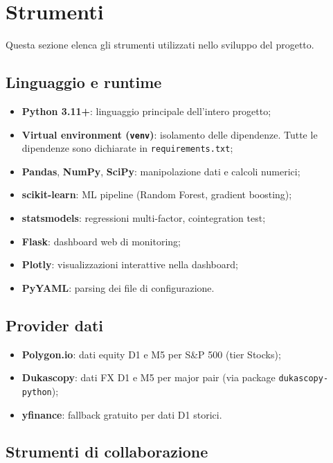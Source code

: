 \section{Strumenti}

Questa sezione elenca gli strumenti utilizzati nello sviluppo del progetto.

\subsection{Linguaggio e runtime}

\begin{itemize}
  \item \textbf{Python 3.11+}: linguaggio principale dell'intero progetto;
  \item \textbf{Virtual environment (\texttt{venv})}: isolamento delle dipendenze. Tutte le dipendenze sono dichiarate in \texttt{requirements.txt};
  \item \textbf{Pandas}, \textbf{NumPy}, \textbf{SciPy}: manipolazione dati e calcoli numerici;
  \item \textbf{scikit-learn}: ML pipeline (Random Forest, gradient boosting);
  \item \textbf{statsmodels}: regressioni multi-factor, cointegration test;
  \item \textbf{Flask}: dashboard web di monitoring;
  \item \textbf{Plotly}: visualizzazioni interattive nella dashboard;
  \item \textbf{PyYAML}: parsing dei file di configurazione.
\end{itemize}

\subsection{Provider dati}

\begin{itemize}
  \item \textbf{Polygon.io}: dati equity D1 e M5 per S\&P 500 (tier Stocks);
  \item \textbf{Dukascopy}: dati FX D1 e M5 per major pair (via package \texttt{dukascopy-python});
  \item \textbf{yfinance}: fallback gratuito per dati D1 storici.
\end{itemize}

\subsection{Strumenti di collaborazione}

